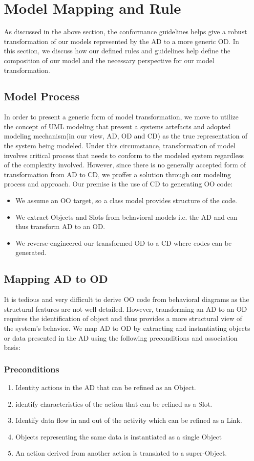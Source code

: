 \documentclass[10pt]{article}
\begin{document}
\section{Model Mapping and Rule}
As discussed in the above section, the conformance guidelines helps give a robust transformation of our models represented by the AD to a more generic OD. In this section, we discuss how our defined rules and guidelines help define the composition of our model and the necessary perspective for our model transformation. 

\subsection{Model Process}
In order to present a generic form of model transformation, we move to utilize the concept of UML modeling that present a systems artefacts and adopted modeling mechanism(in our view, AD, OD and CD) as the true representation of the system being modeled. Under this circumstance, transformation of model involves critical process that needs to conform to the modeled system regardless of the complexity involved. However, since there is no generally accepted form of transformation from AD to CD, we proffer a solution through our modeling process and approach. Our premise is the use of CD to generating OO code:
\begin{itemize}
\item We assume an OO target, so a class model provides structure of the code.
\item We extract Objects and Slots from behavioral models i.e. the AD and can thus transform AD to an OD.
\item We reverse-engineered our transformed OD to a CD where codes can be generated.
\end{itemize}

\subsection{Mapping AD to OD}
It is tedious and very difficult to derive OO code from behavioral diagrams as the structural features are not well detailed. However, transforming an AD to an OD requires the identification of object and thus provides a more structural view of the system's behavior. We map AD to OD by extracting and instantiating objects or data presented in the AD using the following preconditions and association basis:
\subsubsection{Preconditions}
\begin{enumerate}
\item Identity actions in the AD that can be refined as an Object.
\item identify characteristics of the action that can be refined as a Slot.
\item Identify data flow in and out of the activity which can be refined as a Link.
\item Objects representing the same data is instantiated as a single Object
\item An action derived from another action is translated to a super-Object.
\end{enumerate} 
\end{document}
